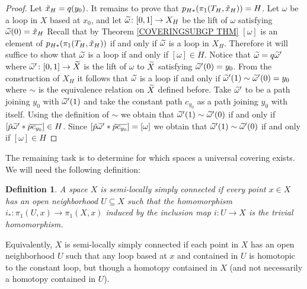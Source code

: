 \documentclass[11pt, letterpaper, oneside]{report}
\theoremstyle{pplain}
\theoremstyle{ddefinition}
\newtheorem{definition}[theorem]{Definition}
\theoremstyle{nnn}
\theoremstyle{eexercise}
\newcommand{\ntilde}{\skew{3}\tilde}
\newcommand{\nwidetilde}{\skew{4}\widetilde}
\begin{document}
\begin{proof}
Let $\ntilde{x}_{H} = q(y_{0})$. It remains to prove that $p_{H\ast}(\pi_{1}(T_{H}, \ntilde{x}_{H})) = H$. 
Let $\omega$ be a loop in $X$ based at $x_{0}$, and let $\nwidetilde \omega \colon [0, 1] \to X_{H}$ 
be the lift of $\omega$ satisfying $\nwidetilde \omega (0) = \ntilde{x}_{H}$ 
Recall that by Theorem \ref{COVERINGSUBGP THM}  $[\omega]$ is an element of $p_{H\ast}(\pi_{1}(T_{H}, \ntilde{x}_{H}))$ if and only if 
$\nwidetilde \omega$ is a loop in $X_{H}$.
Therefore it will suffice  to show that  $\nwidetilde\omega$ is a loop if and only if $[\omega] \in H$.  
Notice that  $\nwidetilde \omega =  q \nwidetilde \omega'$  where  $\nwidetilde \omega' \colon [0, 1]\to \nwidetilde X$ is the lift 
of $\omega$ to $\nwidetilde X$ satisfying  $\nwidetilde \omega'(0) = y_{0}$. 
From the  construction  of $X_{H}$ it follows that  $\nwidetilde \omega$ is a loop if and only if
$\nwidetilde\omega'(1) \sim \nwidetilde \omega'(0) = y_{0}$ where $\sim$ is the equivalence relation on $\nwidetilde X$ defined before. 
Take  $\nwidetilde \omega'$ to be a path joining $y_{0}$ with $\nwidetilde \omega'(1)$ and take the constant path $c_{y_{0}}$ as a path joining $y_{0}$ with itself. Using the definition of $\sim$ 
we obtain that $\nwidetilde\omega'(1) \sim \nwidetilde \omega'(0)$
if and only if $[\tilde p \nwidetilde\omega' \ast \tilde p \overline{c_{y_{0}}} ] \in H$.  Since 
$[\tilde p \nwidetilde\omega' \ast \tilde p \overline{c_{y_{0}}} ] = [\omega]$ we obtain that 
$\nwidetilde\omega'(1) \sim \nwidetilde \omega'(0)$
if and only if $[\omega] \in H$

\end{proof}


The remaining task is to determine for which spaces a universal covering exists. We will need the following definition:

\begin{definition}
\label{SEMILOC SIMPLY CONN DEF}
A space $X$ is \emph{semi-locally simply connected} if  every point $x\in X$ has an open neighborhood
$U\subseteq X$ such that the homomorphism $i_{\ast}\colon \pi_{1}(U, x) \to \pi_{1}(X, x)$ induced by 
the inclusion map $i\colon U\to X$ is the trivial homomorphism.  
\end{definition}

Equivalently, $X$ is semi-locally simply connected if each point in $X$ has an open neighborhood $U$ such that 
any loop based at $x$ and contained in $U$ is homotopic to the constant loop, but  though a homotopy 
contained in $X$ (and not necessarily a homotopy contained in $U$). 
\end{document}
